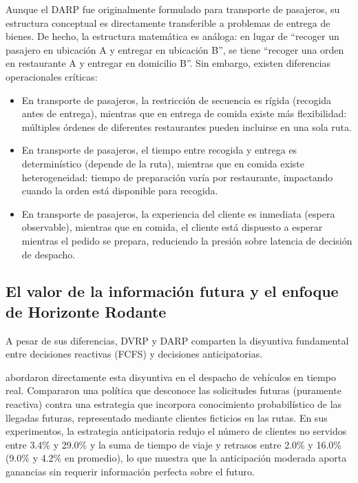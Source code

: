 \documentclass[12pt,letterpaper,oneside]{book}
\begin{document}
Aunque el DARP fue originalmente formulado para transporte de pasajeros, su estructura conceptual es 
directamente transferible a problemas de entrega de bienes. De hecho, la estructura matemática es análoga: 
en lugar de ``recoger un pasajero en ubicación A y entregar en ubicación B'', se tiene ``recoger una 
orden en restaurante A y entregar en domicilio B''. Sin embargo, existen diferencias operacionales críticas:

\begin{itemize}
	\item En transporte de pasajeros, la restricción de secuencia es rígida (recogida antes de entrega), 
	mientras que en entrega de comida existe más flexibilidad: múltiples órdenes de diferentes restaurantes 
	pueden incluirse en una sola ruta.
	
	\item En transporte de pasajeros, el tiempo entre recogida y entrega es determinístico (depende de la 
	ruta), mientras que en comida existe heterogeneidad: tiempo de preparación varía por restaurante, 
	impactando cuando la orden está disponible para recogida.
	
	\item En transporte de pasajeros, la experiencia del cliente es inmediata (espera observable), mientras 
	que en comida, el cliente está dispuesto a esperar mientras el pedido se prepara, reduciendo la presión 
	sobre latencia de decisión de despacho.
\end{itemize}

\subsection{El valor de la información futura y el enfoque de Horizonte Rodante}

A pesar de sus diferencias, DVRP y DARP comparten la disyuntiva fundamental entre
decisiones reactivas (FCFS) y decisiones anticipatorias.

\citet{Ichoua2006DDARP} abordaron directamente esta disyuntiva en el despacho de vehículos en tiempo real. Compararon
una política que desconoce las solicitudes futuras (puramente reactiva) contra una estrategia que incorpora
conocimiento probabilístico de las llegadas futuras, representado mediante clientes ficticios en las rutas.
En sus experimentos, la estrategia anticipatoria redujo el número de clientes no servidos entre 3.4\% y 29.0\%
y la suma de tiempo de viaje y retrasos entre 2.0\% y 16.0\% (9.0\% y 4.2\% en promedio), lo que muestra que
la anticipación moderada aporta ganancias sin requerir información perfecta sobre el futuro.
\end{document}
